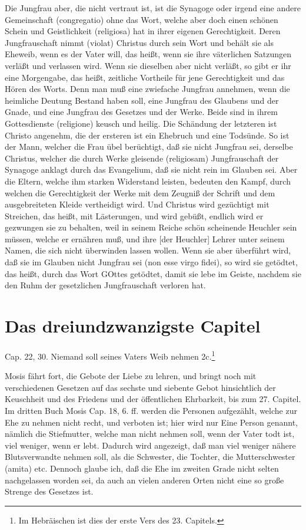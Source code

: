 Die Jungfrau aber, die nicht vertraut ist,
ist die Synagoge oder irgend eine andere Gemeinschaft (congregatio) ohne das Wort, welche aber doch einen schönen Schein und Geistlichkeit (religiosa) hat in ihrer eigenen Gerechtigkeit. Deren Jungfrauschaft nimmt (violat) Christus durch sein Wort und behält sie als Eheweib, wenn es der Vater will, das heißt, wenn sie ihre väterlichen Satzungen verläßt und verlassen wird. Wenn sie dieselben aber nicht verläßt, so gibt er ihr eine Morgengabe, das heißt, zeitliche Vortheile für jene Gerechtigkeit und das Hören des Worts. Denn man muß eine zwiefache Jungfrau annehmen, wenn die heimliche Deutung Bestand haben soll, eine Jungfrau des Glaubens und der Gnade, und eine Jungfrau des Gesetzes und der Werke. Beide sind in ihrem Gottesdienste (religione) keusch und heilig. Die Schändung der letzteren ist Christo angenehm, die der ersteren ist ein Ehebruch und eine Todsünde. So ist der Mann, welcher die Frau übel berüchtigt, daß sie nicht Jungfrau sei, derselbe Christus, welcher die durch Werke gleisende (religiosam) Jungfrauschaft der Synagoge anklagt durch das Evangelium, daß sie nicht rein im Glauben sei. Aber die Eltern, welche ihm starken Widerstand leisten, bedeuten den Kampf, durch welchen die Gerechtigkeit der Werke mit dem Zeugniß der Schrift und dem ausgebreiteten Kleide vertheidigt wird. Und Christus wird gezüchtigt mit Streichen, das heißt, mit Lästerungen, und wird gebüßt, endlich wird er gezwungen sie zu behalten, weil in seinem Reiche schön scheinende Heuchler sein müssen, welche er ernähren muß, und ihre [der Heuchler] Lehrer unter seinem Namen, die sich nicht überwinden lassen wollen. Wenn sie aber überführt wird, daß sie im Glauben nicht Jungfrau sei (non esse virgo fidei), so wird sie getödtet, das heißt, durch das Wort GOttes getödtet, damit sie lebe im Geiste, nachdem sie den Ruhm der gesetzlichen Jungfrauschaft verloren hat.

\section{Das dreiundzwanzigste Capitel}

Cap. 22, 30. Niemand soll seines Vaters Weib nehmen 2c.\footnote{Im Hebräischen ist dies der erste Vers des 23. Capitels.}

Mosis fährt fort, die Gebote der Liebe zu lehren, und bringt noch mit verschiedenen Gesetzen auf das sechste und siebente Gebot hinsichtlich der Keuschheit und des Friedens und der öffentlichen Ehrbarkeit, bis zum 27. Capitel. Im dritten Buch Mosis Cap. 18, 6. ff. werden die Personen aufgezählt, welche zur Ehe zu nehmen nicht recht, und verboten ist; hier wird nur Eine Person genannt, nämlich die Stiefmutter, welche man nicht nehmen soll, wenn der Vater todt ist, viel weniger, wenn er lebt. Dadurch wird angezeigt, daß man viel weniger nähere Blutsverwandte nehmen soll, als die Schwester, die Tochter, die Mutterschwester (amita) etc. Dennoch glaube ich, daß die Ehe im zweiten Grade nicht selten nachgelassen worden sei, da auch an vielen anderen Orten nicht eine so große Strenge des Gesetzes ist.


